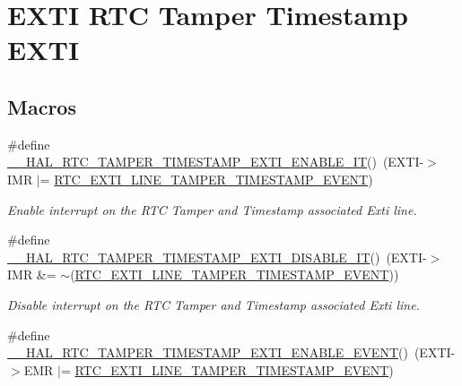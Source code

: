 \hypertarget{group___r_t_c_ex___tamper___timestamp}{}\section{E\+X\+TI R\+TC Tamper Timestamp E\+X\+TI}
\label{group___r_t_c_ex___tamper___timestamp}
\subsection*{Macros}
\begin{DoxyCompactItemize}
\item 
\#define \hyperlink{group___r_t_c_ex___tamper___timestamp_gab0d6016495814d67a8ec74f77631abb9}{\+\_\+\+\_\+\+H\+A\+L\+\_\+\+R\+T\+C\+\_\+\+T\+A\+M\+P\+E\+R\+\_\+\+T\+I\+M\+E\+S\+T\+A\+M\+P\+\_\+\+E\+X\+T\+I\+\_\+\+E\+N\+A\+B\+L\+E\+\_\+\+IT}()~(E\+X\+TI-\/$>$I\+MR $\vert$= \hyperlink{group___r_t_c_ex___private___constants_gaffa3448885f1dec216899aef7f49471f}{R\+T\+C\+\_\+\+E\+X\+T\+I\+\_\+\+L\+I\+N\+E\+\_\+\+T\+A\+M\+P\+E\+R\+\_\+\+T\+I\+M\+E\+S\+T\+A\+M\+P\+\_\+\+E\+V\+E\+NT})
\begin{DoxyCompactList}\small\item\em Enable interrupt on the R\+TC Tamper and Timestamp associated Exti line. \end{DoxyCompactList}\item 
\#define \hyperlink{group___r_t_c_ex___tamper___timestamp_ga5c1481eec3337b2382fc08d19a856d71}{\+\_\+\+\_\+\+H\+A\+L\+\_\+\+R\+T\+C\+\_\+\+T\+A\+M\+P\+E\+R\+\_\+\+T\+I\+M\+E\+S\+T\+A\+M\+P\+\_\+\+E\+X\+T\+I\+\_\+\+D\+I\+S\+A\+B\+L\+E\+\_\+\+IT}()~(E\+X\+TI-\/$>$I\+MR \&= $\sim$(\hyperlink{group___r_t_c_ex___private___constants_gaffa3448885f1dec216899aef7f49471f}{R\+T\+C\+\_\+\+E\+X\+T\+I\+\_\+\+L\+I\+N\+E\+\_\+\+T\+A\+M\+P\+E\+R\+\_\+\+T\+I\+M\+E\+S\+T\+A\+M\+P\+\_\+\+E\+V\+E\+NT}))
\begin{DoxyCompactList}\small\item\em Disable interrupt on the R\+TC Tamper and Timestamp associated Exti line. \end{DoxyCompactList}\item 
\#define \hyperlink{group___r_t_c_ex___tamper___timestamp_ga8cc93e4f8a6e3bf90657c48e5e3ae521}{\+\_\+\+\_\+\+H\+A\+L\+\_\+\+R\+T\+C\+\_\+\+T\+A\+M\+P\+E\+R\+\_\+\+T\+I\+M\+E\+S\+T\+A\+M\+P\+\_\+\+E\+X\+T\+I\+\_\+\+E\+N\+A\+B\+L\+E\+\_\+\+E\+V\+E\+NT}()~(E\+X\+TI-\/$>$E\+MR $\vert$= \hyperlink{group___r_t_c_ex___private___constants_gaffa3448885f1dec216899aef7f49471f}{R\+T\+C\+\_\+\+E\+X\+T\+I\+\_\+\+L\+I\+N\+E\+\_\+\+T\+A\+M\+P\+E\+R\+\_\+\+T\+I\+M\+E\+S\+T\+A\+M\+P\+\_\+\+E\+V\+E\+NT})

\end{DoxyCompactItemize}
